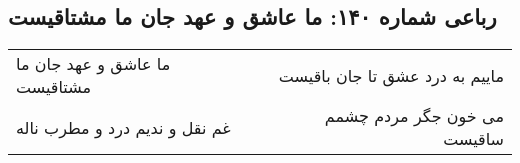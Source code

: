 \begin{center}
\section*{رباعی شماره ۱۴۰: ما عاشق و عهد جان ما مشتاقیست}
\label{sec:sh140}
\begin{longtable}{l p{0.5cm} r}
ما عاشق و عهد جان ما مشتاقیست
&&
ماییم به درد عشق تا جان باقیست
\\
غم نقل و ندیم درد و مطرب ناله
&&
می خون جگر مردم چشمم ساقیست
\\
\end{longtable}
\end{center}
